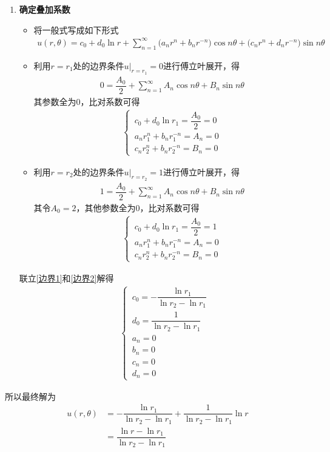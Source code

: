 \begin{enumerate}[\textbf{步骤}1 ]
	\item \textbf{确定叠加系数}
	\begin{itemize}
		\item 将一般式写成如下形式
		\begin{align}
			u(r, \theta) =  c_0 + d_0 \ln r + \sum_{n = 1}^\infty \big(a_n r^n + b_n r^{-n}\big)\cos n\theta  + \big(c_n r^n + d_n r^{-n}\big)\sin n\theta
		\end{align}
		
		\item 利用$r = r_1$处的边界条件$u|_{r = r_1} = 0$进行傅立叶展开，得
		\begin{align}
			0 = \dfrac{A_0}{2} + \sum_{n=1}^{\infty} A_n\cos n \theta + B_n\sin n \theta 
		\end{align}
		其参数全为0，比对系数可得
		\begin{align}
			\begin{cases}
				\, c_0 + d_0 \ln r_1 = \dfrac{A_0}{2} = 0\\
				\, a_nr_1^n + b_n r_1^{-n} = A_n = 0\\
				\, c_nr_2^n + b_n r_2^{-n} = B_n = 0
			\end{cases}
			\label{边界1}
		\end{align}
		
		\item 利用$r = r_2$处的边界条件$u|_{r = r_2} = 1$进行傅立叶展开，得
		\begin{align}
			1 = \dfrac{A_0}{2} + \sum_{n=1}^{\infty} A_n\cos n \theta + B_n\sin n \theta 
		\end{align}
		其令$A_0 =2$，其他参数全为0，比对系数可得
		\begin{align}
			\begin{cases}
				\, c_0 + d_0 \ln r_1 = \dfrac{A_0}{2} = 1\\
				\, a_nr_1^n + b_n r_1^{-n} = A_n = 0\\
				\, c_nr_2^n + b_n r_2^{-n} = B_n = 0
			\end{cases}
			\label{边界2}
		\end{align}
	\end{itemize}
	联立\eqref{边界1}和\eqref{边界2}解得
	\begin{align}
		\begin{cases}
			\, c_0 = -\dfrac{\ln r_1}{\ln r_2 - \ln r_1}\\[0.5em]
			\, d_0 = \dfrac{1}{\ln r_2 - \ln r_1}\\[0.5em]
			\, a_n = 0\\
			\, b_n = 0\\
			\, c_n = 0\\
			\, d_n = 0
		\end{cases}
	\end{align}
\end{enumerate}
所以最终解为
\begin{equation}
	\begin{split}
		u(r, \theta) &=  -\dfrac{\ln r_1}{\ln r_2 - \ln r_1} + \dfrac{1}{\ln r_2 - \ln r_1} \ln r\\[0.5em]
		& = \dfrac{\ln r - \ln r_1}{\ln r_2 - \ln r_1}
	\end{split}
\end{equation}

